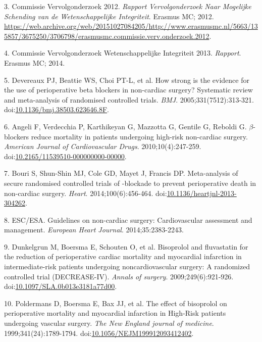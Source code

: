 \documentclass[]{article}
\begin{document}
\hypertarget{ref-commissie2012}{}
3. Commissie Vervolgonderzoek 2012. \emph{Rapport Vervolgonderzoek Naar
Mogelijke Schending van de Wetenschappelijke Integriteit}. Erasmus MC;
2012.
\url{https://web.archive.org/web/20151027084205/http://www.erasmusmc.nl/5663/135857/3675250/3706798/erasmusmc.commissie.verv.onderzoek.2012}.

\hypertarget{ref-commissie2013}{}
4. Commissie Vervolgonderzoek Wetenschappelijke Integriteit 2013.
\emph{Rapport}. Erasmus MC; 2014.

\hypertarget{ref-Devereaux313}{}
5. Devereaux PJ, Beattie WS, Choi PT-L, et al. How strong is the
evidence for the use of perioperative beta blockers in non-cardiac
surgery? Systematic review and meta-analysis of randomised controlled
trials. \emph{BMJ}. 2005;331(7512):313-321.
doi:\href{https://doi.org/10.1136/bmj.38503.623646.8F}{10.1136/bmj.38503.623646.8F}.

\hypertarget{ref-Angeli2010}{}
6. Angeli F, Verdecchia P, Karthikeyan G, Mazzotta G, Gentile G, Reboldi
G. \(\beta\)-blockers reduce mortality in patients undergoing high-risk
non-cardiac surgery. \emph{American Journal of Cardiovascular Drugs}.
2010;10(4):247-259.
doi:\href{https://doi.org/10.2165/11539510-000000000-00000}{10.2165/11539510-000000000-00000}.

\hypertarget{ref-bouri2014}{}
7. Bouri S, Shun-Shin MJ, Cole GD, Mayet J, Francis DP. Meta-analysis of
secure randomised controlled trials of -blockade to prevent
perioperative death in non-cardiac surgery. \emph{Heart}.
2014;100(6):456-464.
doi:\href{https://doi.org/10.1136/heartjnl-2013-304262}{10.1136/heartjnl-2013-304262}.

\hypertarget{ref-esc2014}{}
8. ESC/ESA. Guidelines on non-cardiac surgery: Cardiovascular assessment
and management. \emph{European Heart Journal}. 2014;35:2383-2243.

\hypertarget{ref-dunkelgrun2009}{}
9. Dunkelgrun M, Boersma E, Schouten O, et al. Bisoprolol and
fluvastatin for the reduction of perioperative cardiac mortality and
myocardial infarction in intermediate-risk patients undergoing
noncardiovascular surgery: A randomized controlled trial (DECREASE-IV).
\emph{Annals of surgery}. 2009;249(6):921-926.
doi:\href{https://doi.org/10.1097/SLA.0b013e3181a77d00}{10.1097/SLA.0b013e3181a77d00}.

\hypertarget{ref-poldermans1999}{}
10. Poldermans D, Boersma E, Bax JJ, et al. The effect of bisoprolol on
perioperative mortality and myocardial infarction in High-Risk patients
undergoing vascular surgery. \emph{The New England journal of medicine}.
1999;341(24):1789-1794.
doi:\href{https://doi.org/10.1056/NEJM199912093412402}{10.1056/NEJM199912093412402}.
\end{document}
